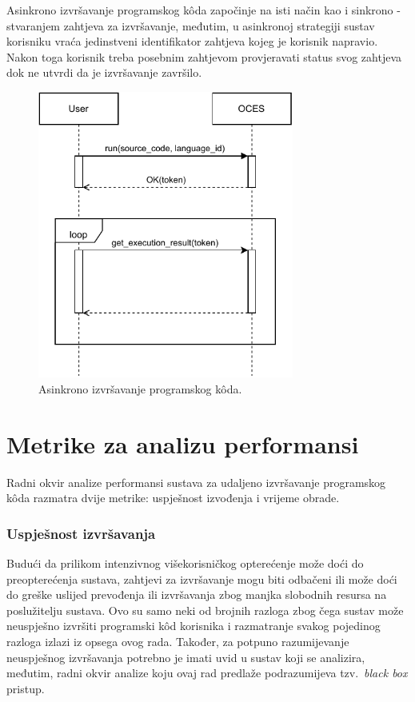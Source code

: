 \documentclass[times, utf8, diplomski]{fer}
\begin{document}
Asinkrono izvršavanje programskog kôda započinje na isti način kao i sinkrono - stvaranjem zahtjeva za izvršavanje, međutim, u asinkronoj strategiji sustav korisniku vraća jedinstveni identifikator zahtjeva kojeg je korisnik napravio. Nakon toga korisnik treba posebnim zahtjevom provjeravati status svog zahtjeva dok ne utvrdi da je izvršavanje završilo.

\begin{figure}[htb]
	\centering
	\includegraphics[width=0.75\textwidth]{images/async-execution.pdf}
	\caption{
		Asinkrono izvršavanje programskog kôda.
	}
	\label{fig:sync-execution}
\end{figure}

\section{Metrike za analizu performansi}
Radni okvir analize performansi sustava za udaljeno izvršavanje programskog kôda razmatra dvije metrike: uspješnost izvođenja i vrijeme obrade.

\subsubsection{Uspješnost izvršavanja}
Budući da prilikom intenzivnog višekorisničkog opterećenje može doći do preopterećenja sustava, zahtjevi za izvršavanje mogu biti odbačeni ili može doći do greške uslijed prevođenja ili izvršavanja zbog manjka slobodnih resursa na poslužitelju sustava. Ovo su samo neki od brojnih razloga zbog čega sustav može neuspješno izvršiti programski kôd korisnika i razmatranje svakog pojedinog razloga izlazi iz opsega ovog rada. Također, za potpuno razumijevanje neuspješnog izvršavanja potrebno je imati uvid u sustav koji se analizira, međutim, radni okvir analize koju ovaj rad predlaže podrazumijeva tzv.\ \textit{black box} pristup.
\end{document}
